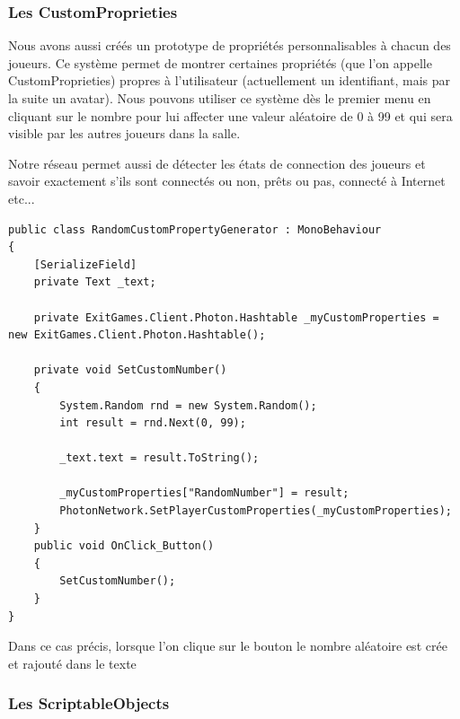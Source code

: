 \documentclass{article}
\begin{document}
\subsubsection{Les CustomProprieties}

Nous avons aussi créés un prototype de propriétés personnalisables à chacun des joueurs. Ce système permet de montrer certaines propriétés (que l’on appelle CustomProprieties) propres à l'utilisateur (actuellement un identifiant, mais par la suite un avatar). Nous pouvons utiliser ce système dès le premier menu en cliquant sur le nombre pour lui affecter une valeur aléatoire de 0 à 99 et qui sera visible par les autres joueurs dans la salle.

Notre réseau permet aussi de détecter les états de connection des joueurs et savoir exactement s’ils sont connectés ou non, prêts ou pas, connecté à Internet etc...
\newpage
\begin{lstlisting}
public class RandomCustomPropertyGenerator : MonoBehaviour
{
    [SerializeField] 
    private Text _text;
    
    private ExitGames.Client.Photon.Hashtable _myCustomProperties = new ExitGames.Client.Photon.Hashtable();

    private void SetCustomNumber()
    {
        System.Random rnd = new System.Random();
        int result = rnd.Next(0, 99);

        _text.text = result.ToString();

        _myCustomProperties["RandomNumber"] = result;
        PhotonNetwork.SetPlayerCustomProperties(_myCustomProperties);
    }
    public void OnClick_Button()
    {
        SetCustomNumber();
    }
}
\end{lstlisting}

Dans ce cas précis, lorsque l'on clique sur le bouton le nombre aléatoire est crée et rajouté dans le texte

\subsubsection{Les ScriptableObjects}
\end{document}

